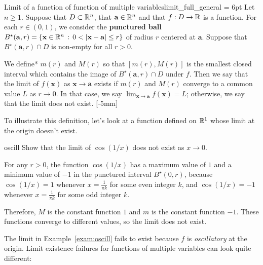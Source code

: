 \documentclass[prettycode,shellescape]{watsonbook}
\begin{document}
\begin{defn}{Limit of a function of function of multiple
    variables}{limit_full_general} \parskip = 6pt Let $n \geq
  1$. Suppose that $D \subset \mathbb{R}^n$, that $\mathbf{a}\in \mathbb{R}^n$ and
  that $f:D \to \mathbb{R}$ is a function. For each $r \in (0,1)$, we consider
  the \textbf{punctured ball}
  $B^\star(\mathbf{a},r) = \{\mathbf{x} \in \mathbb{R}^n \,: \, 0 <
  \left|\mathbf{x} - \mathbf{a}\right| \leq r \}$ of radius $r$
  centered at $\mathbf{a}$. Suppose that $B^\star(\mathbf{a},r) \cap
  D$ is non-empty for all $r > 0$. 

  We define* $m(r)$ and $M(r)$ so that $[m(r),M(r)]$ is the smallest
  closed interval which contains the image of
  $B^\star(\mathbf{a},r) \cap D$ under $f$. Then we say that the limit
  of $f(\mathbf{x})$ as $\mathbf{x} \to \mathbf{a}$ exists if $m(r)$
  and $M(r)$ converge to a common value $L$ as $r \to 0$. In that
  case, we say
  $\displaystyle{\lim_{\mathbf{x} \to \mathbf{a}} f(\mathbf{x}) = L}$;
  otherwise, we say that the limit does not exist. [-5mm]
\end{defn}

To illustrate this definition, let's look at a function defined on $\mathbb{R}^1$ whose limit at the origin doesn't exist. 

\begin{example}{}{oscill}
  Show that the limit of $\cos (1/x)$ does not exist as $x\to0$. 
\end{example}

\begin{solution}
  For any $r>0$, the function $\cos(1/x)$ has a maximum value of $1$
  and a minimum value of $-1$ in the punctured interval
  $B^\star(0,r)$, because $\cos(1/x) = 1$ whenever $x = \tfrac{1}{\pi
    k}$ for some even integer $k$, and $\cos(1/x) = -1$ whenever $x=
  \tfrac{1}{\pi k}$ for some odd integer $k$.
  
  Therefore, $M$ is the constant function $1$ and $m$
  is the constant function $-1$. These functions converge to different
  values, so the limit does not exist. 
\end{solution}

The limit in Example~\ref{exam:oscill} fails to exist because $f$ is
\textit{oscillatory} at the origin. Limit existence failures for
functions of multiple variables can look quite different: 
\end{document}
